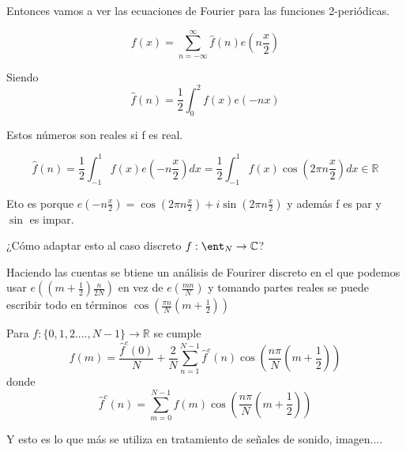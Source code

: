 	
	\begin{center}
		\centering
	\end{center}
	
	
	Entonces vamos a ver las ecuaciones de Fourier para las funciones 2-periódicas.
	
	$$f(x) = \sum_{n=-\infty}^{\infty} \widehat{f}(n)e(n\frac{x}{2})$$
	
	Siendo
	$$\widehat{f}(n) = \frac{1}{2} \int_{0}^{2} f(x) e(-nx)$$
	
	Estos números son reales si f es real.
	
	$$\widehat{f}(n) = \frac{1}{2} \int_{-1}^{1} f(x) e(-n\frac{x}{2}) dx = \frac{1}{2} \int_{-1}^{1} f(x)\cos(2\pi n \frac{x}{2})dx \in \mathbb{R}$$
	
	Eto es porque $e(-n\frac{x}{2}) = \cos(2\pi n \frac{x}{2}) + i \sin(2\pi n \frac{x}{2})$ y además f es par y $\sin$ es impar.
	
	¿Cómo adaptar esto al caso discreto $f: \ent_N \rightarrow \mathbb{C}$?
	
	\begin{center}
		\centering
	\end{center}
	
	Haciendo las cuentas se btiene un análisis de Fourirer discreto en el que podemos usar $e((m + \frac{1}{2}) \frac{n}{2N})$ en vez de $e(\frac{mn}{N})$ y tomando partes reales se puede escribir todo en términos $\cos(\frac{\pi n}{N}(m+ \frac{1}{2}))$
	
	\begin{prop}
		Para $f : \{0,1,2....,N-1\} \rightarrow \mathbb{R}$ se cumple
		$$f(m) = \frac{\widehat{f}^c(0)}{N} + \frac{2}{N} \sum_{n=1}^{N-1} \widehat{f}^c(n) \cos(\frac{n\pi}{N}(m + \frac{1}{2}))$$
		donde
		$$\widehat{f}^c(n)= \sum_{m= 0}^{N-1} f(m) \cos(\frac{n\pi}{N}(m+ \frac{1}{2}))$$
	\end{prop}
	\begin{obs} Y esto es lo que más se utiliza en tratamiento de señales de sonido, imagen....
	\end{obs}

